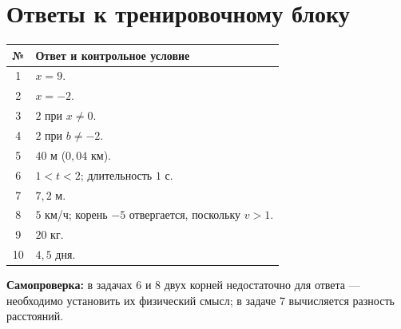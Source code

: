 \documentclass[a4paper,12pt]{article}
\newcommand{\key}[1]{\textbf{\color{darkaccent}#1}}
\begin{document}
\section*{Ответы к тренировочному блоку}
\renewcommand{\arraystretch}{1.56}
\begin{center}
\begin{tabularx}{\linewidth}{@{}cX@{}}
\toprule
№ & Ответ и контрольное условие \\
\midrule
1 & $x=9$. \\
2 & $x=-2$. \\
3 & $2$ при $x\ne0$. \\
4 & $2$ при $b\ne-2$. \\
5 & $40$ м ($0{,}04$ км). \\
6 & $1<t<2$; длительность $1$ с. \\
7 & $7{,}2$ м. \\
8 & $5$ км/ч; корень $-5$ отвергается, поскольку $v>1$. \\
9 & $20$ кг. \\
10 & $4{,}5$ дня. \\
\bottomrule
\end{tabularx}
\end{center}
\vspace{6mm}
\key{Самопроверка:} в задачах 6 и 8 двух корней недостаточно для ответа — необходимо установить их физический смысл; в задаче 7 вычисляется разность расстояний.
\end{document}
